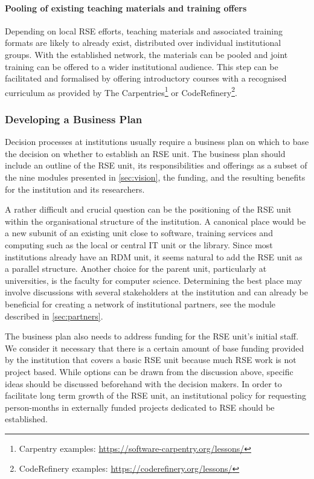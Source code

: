 \documentclass[a4paper]{article}
\begin{document}
\paragraph{Pooling of existing teaching materials and training offers}
Depending on local RSE efforts, teaching materials and associated training formats are likely to already exist,
distributed over individual institutional groups.
With the established network, the materials can be pooled and joint training can be offered to a wider institutional audience.
This step can be facilitated and formalised by offering introductory courses with a recognised curriculum as provided by The Carpentries\footnote{Carpentry examples: \url{https://software-carpentry.org/lessons/}}
or CodeRefinery\footnote{CodeRefinery examples: \url{https://coderefinery.org/lessons/}}.

\subsubsection{Developing a Business Plan}
Decision processes at institutions usually require a business plan on which to base the decision on whether to establish an RSE unit.
The business plan should include an outline of the RSE unit, its responsibilities and offerings as a subset of the nine modules presented in \autoref{sec:vision}, the funding, and the resulting benefits for the institution and its researchers.

A rather difficult and crucial question can be the positioning of the RSE unit within the organisational structure of the institution.
A canonical place would be a new subunit of an existing unit close to software,
training services and computing such as the local or central IT unit or the library.
Since most institutions already have an RDM unit, it seems natural to add the RSE unit as a parallel structure.
Another choice for the parent unit, particularly at universities, is the faculty for computer science.
Determining the best place may involve discussions with several stakeholders at the institution and can already be beneficial for creating a
network of institutional partners, see the module described in \autoref{sec:partners}.

The business plan also needs to address funding for the RSE unit's initial staff.
We consider it necessary that there is a certain amount of base funding provided by the institution that covers a basic RSE unit because much RSE work is not project based.
While options can be drawn from the discussion above, specific ideas should be discussed beforehand with the decision makers.
In order to facilitate long term growth of the RSE unit, an institutional policy for requesting person-months in externally funded projects dedicated to RSE should be established.
\end{document}
